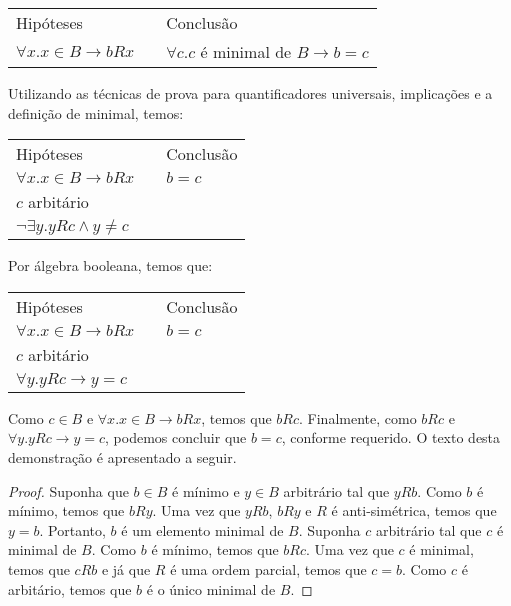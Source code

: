 \vspace{1cm}

\begin{tabular}{lcl}
 Hip\'oteses & \hspace{1cm} & Conclusão\\
 $\forall x. x \in B \rightarrow bRx$ & & $\forall c. c$ \'e minimal de $B \rightarrow b = c$\\
 \end{tabular}
\vspace{1cm}

Utilizando as t\'ecnicas de prova para quantificadores universais, implica\c{c}\~oes e a defini\c{c}\~ao de minimal, temos:

\vspace{1cm}

\begin{tabular}{lcl}
 Hip\'oteses & \hspace{1cm} & Conclusão\\
 $\forall x. x \in B \rightarrow bRx$ & & $b = c$\\
 $c$ arbit\'ario & & \\
 $\neg \exists y. yRc \land y \neq c$ & &
 \end{tabular}
\vspace{1cm}

Por \'algebra booleana, temos que:

\vspace{1cm}

\begin{tabular}{lcl}
 Hip\'oteses & \hspace{1cm} & Conclusão\\
 $\forall x. x \in B \rightarrow bRx$ & & $b = c$\\
 $c$ arbit\'ario & & \\
 $\forall y. yRc \rightarrow y = c$ & &
 \end{tabular}
\vspace{1cm}

Como $c \in B$ e $\forall x. x \in B \rightarrow bRx$, temos que $bRc$. Finalmente, como $bRc$ e  $\forall y. yRc \rightarrow y = c$,
podemos concluir que $b = c$, conforme requerido. O texto desta demonstra\c{c}\~ao \'e apresentado a seguir.

\begin{proof}
	Suponha que $b \in B$ \'e m\'inimo e $y\in B$ arbitr\'ario tal que $yRb$. Como $b$ \'e m\'inimo, temos que $bRy$. Uma vez que
	$yRb$, $bRy$ e $R$ \'e anti-sim\'etrica, temos que $y = b$. Portanto, $b$ \'e um elemento minimal de $B$.
	Suponha $c$ arbitr\'ario tal que $c$ \'e minimal de $B$. Como $b$ \'e m\'inimo, temos que $bRc$. Uma vez que $c$ \'e minimal, temos
	que $cRb$ e j\'a que $R$ \'e uma ordem parcial, temos que $c = b$. Como $c$  \'e arbit\'ario, temos que $b$ \'e o \'unico minimal de $B$.
\end{proof}

